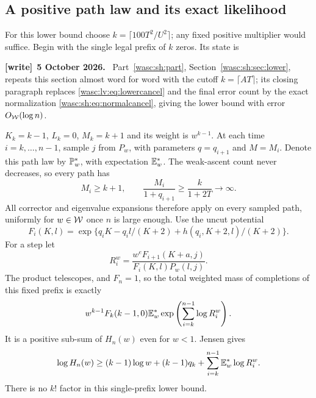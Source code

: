 \documentclass[11pt,a4paper]{article}
\theoremstyle{remark}\newtheorem{remark}[theorem]{Remark}
\numberwithin{equation}{section}
\newenvironment{writenote}[1][]{\par\smallskip\begingroup\small
 \noindent\textbf{[write]}\if\relax\detokenize{#1}\relax\else~\textbf{#1.}\fi\ }%
 {\par\endgroup\smallskip}
\begin{document}
\subsection{A positive path law and its exact likelihood}
For this lower bound choose $k=\lceil100T^2/U^2\rceil$; any fixed positive multiplier would suffice. Begin with the single legal prefix of $k$ zeros. Its state is
\begin{writenote}[5 October 2026]
Part~\ref{wasc:sh:part}, Section~\ref{wasc:sh:sec:lower}, repeats this section almost word for word with the cutoff $k=\lceil AT\rceil$; its closing paragraph replaces \eqref{wasc:lv:eq:lowercancel} and the final error count by the exact normalization \eqref{wasc:sh:eq:normalcancel}, giving the lower bound with error $O_{\mathcal W}(\log n)$.
\end{writenote}
$K_k=k-1$, $L_k=0$, $M_k=k+1$ and its weight is $w^{k-1}$.
At each time $i=k,\ldots,n-1$, sample $j$ from $P_w$, with parameters
$q=q_{i+1}$ and $M=M_i$. Denote this path law by $\mathbb P_w^*$, with expectation $\mathbb E_w^*$.
The weak-ascent count never decreases, so every path has
\begin{equation}\label{wasc:lv:eq:prefixsupport}
M_i\ge k+1,\qquad \frac{M_i}{1+q_{i+1}}\ge\frac{k}{1+2T}\longrightarrow\infty.
\end{equation}
All corrector and eigenvalue expansions therefore apply on every sampled path, uniformly for $w\in\mathcal W$ once $n$ is large enough.
Use the uncut potential
\[
F_i(K,l)=\exp\{q_iK-q_i l/(K+2)+h(q_i,K+2,l)/(K+2)\}.
\]
For a step let
\begin{equation}\label{wasc:lv:eq:likelihoodratio}
R_i^w=\frac{w^eF_{i+1}(K+a,j)}{F_i(K,l)P_w(l,j)}.
\end{equation}
The product telescopes, and $F_n=1$, so the total weighted mass of completions of this fixed prefix is exactly
\[
w^{k-1}F_k(k-1,0)\mathbb E_w^*\exp\left(\sum_{i=k}^{n-1}\log R_i^w\right).
\]
It is a positive sub-sum of $H_n(w)$ even for $w<1$. Jensen gives
\begin{equation}\label{wasc:lv:eq:jensen}
\log H_n(w)\ge(k-1)\log w+(k-1)q_k+
\sum_{i=k}^{n-1}\mathbb E_w^*\log R_i^w.
\end{equation}
There is no $k!$ factor in this single-prefix lower bound.
\end{document}
